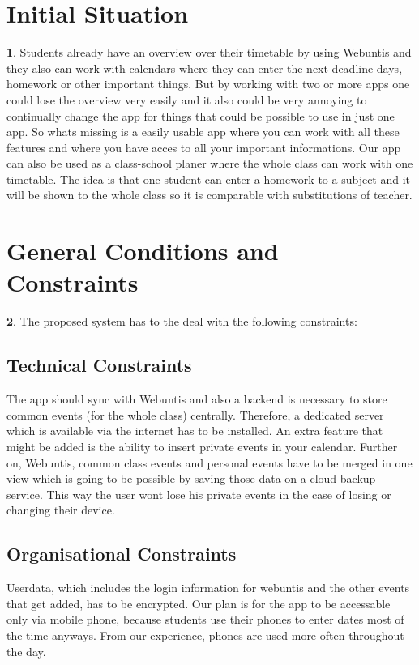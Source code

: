\documentclass[12pt]{article}
\theoremstyle{definition}
\newtheorem{ourVersion}{ \linebreak}
\begin{document}
\section{Initial Situation}

\begin{ourVersion}
Students already have an overview over their timetable by using Webuntis and they also can work with calendars where they can enter the next deadline-days, homework or other important things.
But by working with two or more apps one could lose the overview very easily and it also could be very annoying to continually change the app for things that could be possible to use in just one app. 
So whats missing is a easily usable app where you can work with all these features and where you have acces to all your important informations. Our app can also be used as a class-school planer where the whole class can work with one timetable. The idea is that one student can enter a homework to a subject and it will be shown to the whole class so it is comparable with substitutions of teacher. 
\end{ourVersion}
\pagebreak

\section{General Conditions and Constraints}

\begin{ourVersion}
The proposed system has to the deal with the following constraints: \linebreak

\subsection{Technical Constraints}
The app should sync with Webuntis and also a backend is necessary to store common events (for the whole class) centrally. Therefore, a dedicated server which is available via the internet has to be installed. An extra feature that might be added is the ability to insert private events in your calendar.
Further on, Webuntis, common class events and personal events have to be merged in one view which is going to be possible by saving those data on a cloud backup service. This way the user wont lose his private events in the case of losing or changing their device.

\subsection{Organisational Constraints}
Userdata, which includes the login information for webuntis and the other events that get added, has to be encrypted.
Our plan is for the app to be accessable only via mobile phone, because students use their phones to enter dates most of the time anyways. From our experience, phones are used more often throughout the day.

\end{ourVersion}
\end{document}
